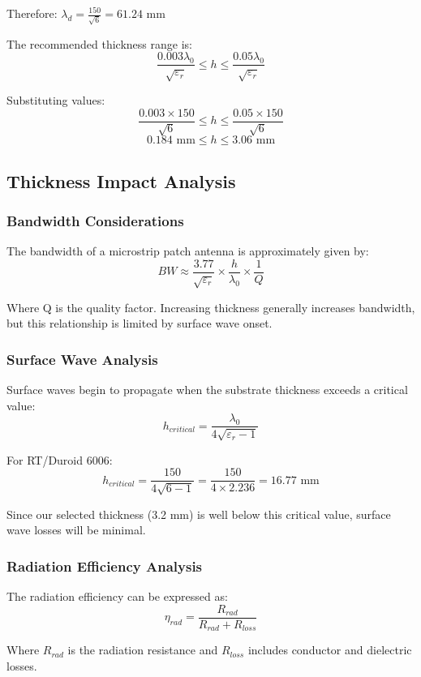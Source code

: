 \documentclass[12pt]{article}
\begin{document}
Therefore: $\lambda_d = \frac{150}{\sqrt{6}} = 61.24$ mm

The recommended thickness range is:
\[\frac{0.003\lambda_0}{\sqrt{\varepsilon_r}} \leq h \leq \frac{0.05\lambda_0}{\sqrt{\varepsilon_r}}\]

Substituting values:
\[\frac{0.003 \times 150}{\sqrt{6}} \leq h \leq \frac{0.05 \times 150}{\sqrt{6}}\]
\[0.184 \text{ mm} \leq h \leq 3.06 \text{ mm}\]

\subsection{Thickness Impact Analysis}

\subsubsection{Bandwidth Considerations}

The bandwidth of a microstrip patch antenna is approximately given by:
\[BW \approx \frac{3.77}{\sqrt{\varepsilon_r}} \times \frac{h}{\lambda_0} \times \frac{1}{Q}\]

Where Q is the quality factor. Increasing thickness generally increases bandwidth, but this relationship is limited by surface wave onset.

\subsubsection{Surface Wave Analysis}

Surface waves begin to propagate when the substrate thickness exceeds a critical value:
\[h_{critical} = \frac{\lambda_0}{4\sqrt{\varepsilon_r - 1}}\]

For RT/Duroid 6006:
\[h_{critical} = \frac{150}{4\sqrt{6-1}} = \frac{150}{4 \times 2.236} = 16.77 \text{ mm}\]

Since our selected thickness (3.2 mm) is well below this critical value, surface wave losses will be minimal.

\subsubsection{Radiation Efficiency Analysis}

The radiation efficiency can be expressed as:
\[\eta_{rad} = \frac{R_{rad}}{R_{rad} + R_{loss}}\]

Where $R_{rad}$ is the radiation resistance and $R_{loss}$ includes conductor and dielectric losses.
\end{document}
